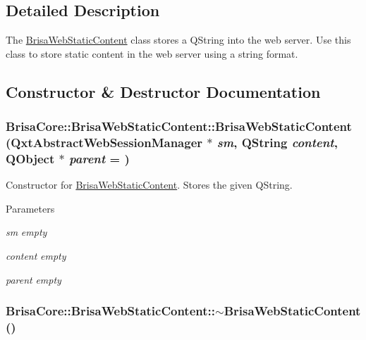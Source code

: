 \subsection{Detailed Description}
The \hyperlink{classBrisaCore_1_1BrisaWebStaticContent}{BrisaWebStaticContent} class stores a QString into the web server. Use this class to store static content in the web server using a string format. 

\subsection{Constructor \& Destructor Documentation}
\hypertarget{classBrisaCore_1_1BrisaWebStaticContent_a7db7885aeb5c92c2a78f14ee627e9786}{
\subsubsection[{BrisaWebStaticContent}]{\setlength{\rightskip}{0pt plus 5cm}BrisaCore::BrisaWebStaticContent::BrisaWebStaticContent (QxtAbstractWebSessionManager $\ast$ {\em sm}, \/  QString {\em content}, \/  QObject $\ast$ {\em parent} = {})}}
\label{classBrisaCore_1_1BrisaWebStaticContent_a7db7885aeb5c92c2a78f14ee627e9786}


Constructor for \hyperlink{classBrisaCore_1_1BrisaWebStaticContent}{BrisaWebStaticContent}. Stores the given QString.


\begin{DoxyParams}{Parameters}
\item[{\em sm}]{\itshape empty\/} \item[{\em content}]{\itshape empty\/} \item[{\em parent}]{\itshape empty\/} \end{DoxyParams}
\hypertarget{classBrisaCore_1_1BrisaWebStaticContent_a64e24afe9b291ccbb9e9cd37a39ab150}{
\subsubsection[{$\sim$BrisaWebStaticContent}]{\setlength{\rightskip}{0pt plus 5cm}BrisaCore::BrisaWebStaticContent::$\sim$BrisaWebStaticContent ()}}
\label{classBrisaCore_1_1BrisaWebStaticContent_a64e24afe9b291ccbb9e9cd37a39ab150}


